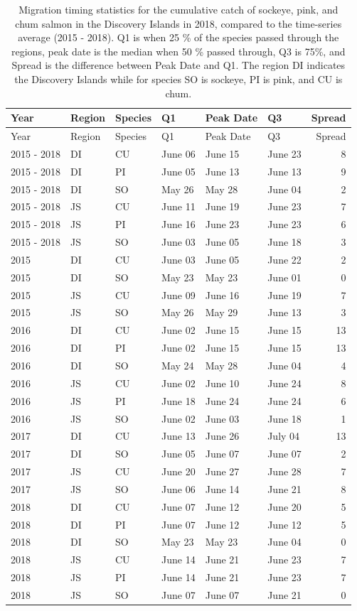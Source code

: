 \documentclass[fleqn,10pt]{wlpeerj} %
\begin{document}
\begin{longtable}[]{@{}llllllr@{}}
\caption{\label{tab:migration-timing-table} Migration timing statistics for the cumulative catch of sockeye, pink, and chum salmon in the Discovery Islands in 2018, compared to the time-series average (2015 - 2018). Q1 is when 25 \% of the species passed through the regions, peak date is the median when 50 \% passed through, Q3 is 75\%, and Spread is the difference between Peak Date and Q1. The region DI indicates the Discovery Islands while for species SO is sockeye, PI is pink, and CU is chum.}\tabularnewline
\toprule
Year & Region & Species & Q1 & Peak Date & Q3 & Spread\tabularnewline
\midrule
\endfirsthead
\toprule
Year & Region & Species & Q1 & Peak Date & Q3 & Spread\tabularnewline
\midrule
\endhead
2015 - 2018 & DI & CU & June 06 & June 15 & June 23 & 8\tabularnewline
2015 - 2018 & DI & PI & June 05 & June 13 & June 13 & 9\tabularnewline
2015 - 2018 & DI & SO & May 26 & May 28 & June 04 & 2\tabularnewline
2015 - 2018 & JS & CU & June 11 & June 19 & June 23 & 7\tabularnewline
2015 - 2018 & JS & PI & June 16 & June 23 & June 23 & 6\tabularnewline
2015 - 2018 & JS & SO & June 03 & June 05 & June 18 & 3\tabularnewline
2015 & DI & CU & June 03 & June 05 & June 22 & 2\tabularnewline
2015 & DI & SO & May 23 & May 23 & June 01 & 0\tabularnewline
2015 & JS & CU & June 09 & June 16 & June 19 & 7\tabularnewline
2015 & JS & SO & May 26 & May 29 & June 13 & 3\tabularnewline
2016 & DI & CU & June 02 & June 15 & June 15 & 13\tabularnewline
2016 & DI & PI & June 02 & June 15 & June 15 & 13\tabularnewline
2016 & DI & SO & May 24 & May 28 & June 04 & 4\tabularnewline
2016 & JS & CU & June 02 & June 10 & June 24 & 8\tabularnewline
2016 & JS & PI & June 18 & June 24 & June 24 & 6\tabularnewline
2016 & JS & SO & June 02 & June 03 & June 18 & 1\tabularnewline
2017 & DI & CU & June 13 & June 26 & July 04 & 13\tabularnewline
2017 & DI & SO & June 05 & June 07 & June 07 & 2\tabularnewline
2017 & JS & CU & June 20 & June 27 & June 28 & 7\tabularnewline
2017 & JS & SO & June 06 & June 14 & June 21 & 8\tabularnewline
2018 & DI & CU & June 07 & June 12 & June 20 & 5\tabularnewline
2018 & DI & PI & June 07 & June 12 & June 12 & 5\tabularnewline
2018 & DI & SO & May 23 & May 23 & June 04 & 0\tabularnewline
2018 & JS & CU & June 14 & June 21 & June 23 & 7\tabularnewline
2018 & JS & PI & June 14 & June 21 & June 23 & 7\tabularnewline
2018 & JS & SO & June 07 & June 07 & June 21 & 0\tabularnewline
\bottomrule
\end{longtable}
\end{document}
